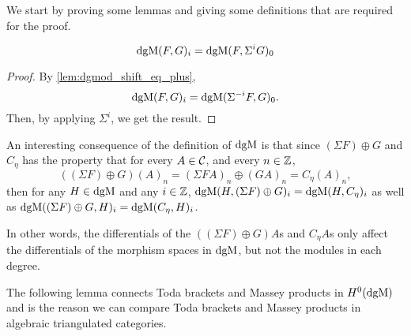 We start by proving some lemmas and giving some definitions that are required for the proof.


\begin{corollary}
    \label{cor:dgm_i_eq_dgm_0_shifted_codomain}
    \[
        \operatorname{dgM}(F, G)_i = \operatorname{dgM}(F, \Sigma^i G)_0
    \]
\end{corollary}
\begin{proof}
    By \autoref{lem:dgmod_shift_eq_plus},
    \[
        \operatorname{dgM}(F, G)_i = \operatorname{dgM}(\Sigma^{-i} F, G)_0.
    \]
    Then, by applying \( \Sigma^i \), we get the result.
\end{proof}

\begin{remark}
    \label{rem:dgm_different_dg_morphisms_same_space_give_degree-wise_same_morphisms}
    An interesting consequence of the definition of \( \operatorname{dgM} \) is that since \( (\Sigma F) \oplus G \) and \( C_{\eta} \) has the property that for every \( A \in {\mathcal{C}} \), and every \( n \in {\mathbb{Z}} \),
    \[
        ((\Sigma F) \oplus G)(A)_n = (\Sigma F A)_n \oplus (G A)_n = C_{\eta}(A)_n,
    \]
    then for any \( H \in \operatorname{dgM} \) and any \( i \in {\mathbb{Z}} \), \( \operatorname{dgM}(H, (\Sigma F) \oplus G)_i = \operatorname{dgM}(H, C_{\eta})_i \) as well as \( \operatorname{dgM}((\Sigma F) \oplus G, H)_i = \operatorname{dgM}(C_{\eta}, H)_i \).

    In other words, the differentials of the \( ((\Sigma F) \oplus G) A \)s and \( C_{\eta} A \)s only affect the differentials of the morphism spaces in \( \operatorname{dgM} \), but not the modules in each degree.
\end{remark}

The following lemma connects Toda brackets and Massey products in \( H^0(\operatorname{dgM}) \) and is the reason we can compare Toda brackets and Massey products in algebraic triangulated categories.


